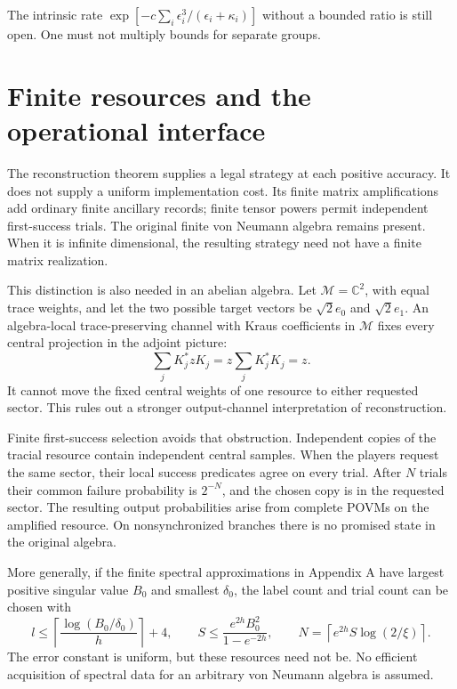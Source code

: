 \documentclass[11pt,reqno]{amsart}
\numberwithin{equation}{section}
\begin{document}
The intrinsic rate \(\exp[-c\sum_i\epsilon_i^3/(\epsilon_i+\kappa_i)]\) without a bounded ratio is still open. One must not multiply bounds for separate groups.

\section{Finite resources and the operational interface}\label{finite-resources-and-the-operational-interface}

The reconstruction theorem supplies a legal strategy at each positive accuracy. It does not supply a uniform implementation cost. Its finite matrix amplifications add ordinary finite ancillary records; finite tensor powers permit independent first-success trials. The original finite von Neumann algebra remains present. When it is infinite dimensional, the resulting strategy need not have a finite matrix realization.

This distinction is also needed in an abelian algebra. Let \(\mathcal M=\mathbb C^2\), with equal trace weights, and let the two possible target vectors be \(\sqrt2e_0\) and \(\sqrt2e_1\). An algebra-local trace-preserving channel with Kraus coefficients in \(\mathcal M\) fixes every central projection in the adjoint picture: \[
 \sum_j K_j^*zK_j=z\sum_jK_j^*K_j=z.
\] It cannot move the fixed central weights of one resource to either requested sector. This rules out a stronger output-channel interpretation of reconstruction.

Finite first-success selection avoids that obstruction. Independent copies of the tracial resource contain independent central samples. When the players request the same sector, their local success predicates agree on every trial. After \(N\) trials their common failure probability is \(2^{-N}\), and the chosen copy is in the requested sector. The resulting output probabilities arise from complete POVMs on the amplified resource. On nonsynchronized branches there is no promised state in the original algebra.

More generally, if the finite spectral approximations in Appendix A have largest positive singular value \(B_0\) and smallest \(\delta_0\), the label count and trial count can be chosen with \[
 l\le\left\lceil\frac{\log(B_0/\delta_0)}h\right\rceil+4,\qquad
 S\le\frac{e^{2h}B_0^2}{1-e^{-2h}},\qquad
 N=\left\lceil e^{2h}S\log(2/\xi)\right\rceil .
\] The error constant is uniform, but these resources need not be. No efficient acquisition of spectral data for an arbitrary von Neumann algebra is assumed.
\end{document}
